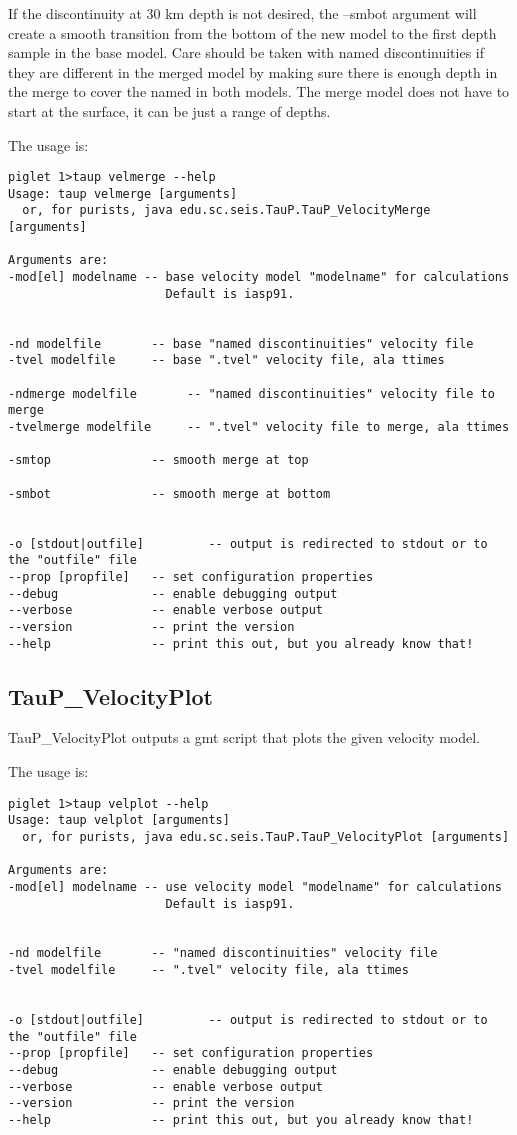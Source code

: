 If the discontinuity at 30 km depth is not desired, the --smbot argument will create a smooth transition from the bottom of the new model to the first depth sample in the base model. Care should be taken with named discontinuities if they are
different in the merged model by making sure there is enough
depth in the merge to cover the named in both models. The merge
model does not have to start at the surface, it can be just a
range of depths.

The usage is:
\begin{verbatim}
piglet 1>taup velmerge --help
Usage: taup velmerge [arguments]
  or, for purists, java edu.sc.seis.TauP.TauP_VelocityMerge [arguments]

Arguments are:
-mod[el] modelname -- base velocity model "modelname" for calculations
                      Default is iasp91.


-nd modelfile       -- base "named discontinuities" velocity file
-tvel modelfile     -- base ".tvel" velocity file, ala ttimes

-ndmerge modelfile       -- "named discontinuities" velocity file to merge
-tvelmerge modelfile     -- ".tvel" velocity file to merge, ala ttimes

-smtop              -- smooth merge at top

-smbot              -- smooth merge at bottom


-o [stdout|outfile]         -- output is redirected to stdout or to the "outfile" file
--prop [propfile]   -- set configuration properties
--debug             -- enable debugging output
--verbose           -- enable verbose output
--version           -- print the version
--help              -- print this out, but you already know that!
\end{verbatim}

\subsection{TauP\_VelocityPlot}

TauP\_VelocityPlot outputs a gmt script that plots the given velocity model.

The usage is:
\begin{verbatim}
piglet 1>taup velplot --help
Usage: taup velplot [arguments]
  or, for purists, java edu.sc.seis.TauP.TauP_VelocityPlot [arguments]

Arguments are:
-mod[el] modelname -- use velocity model "modelname" for calculations
                      Default is iasp91.


-nd modelfile       -- "named discontinuities" velocity file
-tvel modelfile     -- ".tvel" velocity file, ala ttimes


-o [stdout|outfile]         -- output is redirected to stdout or to the "outfile" file
--prop [propfile]   -- set configuration properties
--debug             -- enable debugging output
--verbose           -- enable verbose output
--version           -- print the version
--help              -- print this out, but you already know that!
\end{verbatim}


